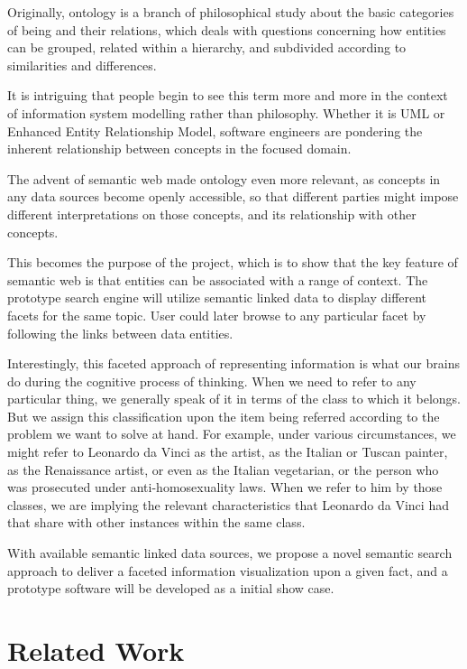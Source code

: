 \documentclass[12pt]{cls}
\begin{document}
Originally, ontology is a branch of philosophical study about the basic categories of being and their relations, which deals with questions concerning how entities can be grouped, related within a hierarchy, and subdivided according to similarities and differences.

It is intriguing that people begin to see this term more and more in the context of information system modelling rather than philosophy. Whether it is UML or Enhanced Entity Relationship Model, software engineers are pondering the inherent relationship between concepts in the focused domain.

The advent of semantic web made ontology even more relevant, as concepts in any data sources become openly accessible, so that different parties might impose different interpretations on those concepts, and its relationship with other concepts.

This becomes the purpose of the project, which is to show that the key feature of semantic web is that entities can be associated with a range of context. The prototype search engine will utilize semantic linked data to display different facets for the same topic. User could later browse to any particular facet by following the links between data entities.

Interestingly, this faceted approach of representing information is what our brains do during the cognitive process of thinking. When we need to refer to any particular thing, we generally speak of it in terms of the class to which it belongs. But we assign this classification upon the item being referred according to the problem we want to solve at hand. For example, under various circumstances, we might refer to Leonardo da Vinci as the artist, as the Italian or Tuscan painter, as the Renaissance artist, or even as the Italian vegetarian, or the person who was prosecuted under anti-homosexuality laws. When we refer to him by those classes, we are implying the relevant characteristics that Leonardo da Vinci had that share with other instances within the same class.

With available semantic linked data sources, we propose a novel semantic search approach to deliver a faceted information visualization upon a given fact, and a prototype software will be developed as a initial show case.

\section{Related Work}
\end{document}

